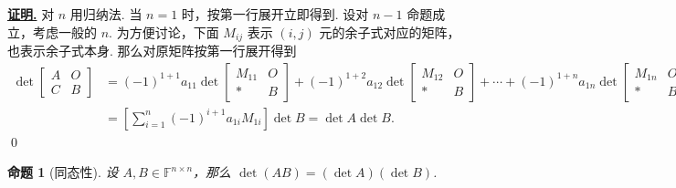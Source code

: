 \documentclass[10pt,openany]{article}
\theoremstyle{thmstyle} %
\theoremstyle{defstyle} %
\theoremstyle{prostyle} %
\newtheorem{proposition}[theorem]{命题}
\theoremstyle{exastyle}
\theoremstyle{remstyle}
\renewenvironment{proof}[1][证明]{\par\underline{\textbf{#1.}} \;\fangsong}{\qed\par}
\newcommand{\F}{\mathbb{F}}
\newcommand{\n}{^{n \times n}}
\begin{document}
\begin{proof}
	对 \( n \) 用归纳法. 当 \( n=1 \) 时，按第一行展开立即得到. 设对 \( n-1 \) 命题成立，考虑一般的 \( n \). 为方便讨论，下面 \( M_{ij} \) 表示 \( (i,j) \) 元的余子式对应的矩阵，也表示余子式本身. 那么对原矩阵按第一行展开得到
	\begin{align*}
		\det \begin{bmatrix}
			A & O \\
			C & B
		\end{bmatrix} &= (-1)^{1+1} a_{11} \det \begin{bmatrix}
		M_{11} & O \\
		* & B
		\end{bmatrix}+ (-1)^{1+2} a_{12} \det \begin{bmatrix}
		M_{12} & O \\
		* & B
		\end{bmatrix}+\cdots+ (-1)^{1+n} a_{1n} \det \begin{bmatrix}
		M_{1n} & O \\
		* & B
		\end{bmatrix} \\
		&= \left[\sum_{i=1}^{n} (-1)^{i+1}a_{1i}M_{1i}\right] \det B= \det A \det B.
	\end{align*}
\end{proof}

\begin{proposition}[同态性]
	设 \( A,B \in \F\n \)，那么 \( \det(AB)=(\det A)(\det B) \).
	\label{2.2.9}
\end{proposition}
\end{document}
